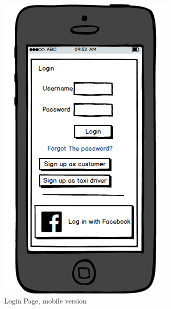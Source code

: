 \documentclass{report}
\begin{document}
			\begin{figure}[H]
			\centering
			\includegraphics[scale=0.4]{IMG/UserInterfaces/CustomerLogin_m.png}
			\caption{Login Page, mobile version}\label{visina8}
			\end{figure}
			
			
\end{document}
